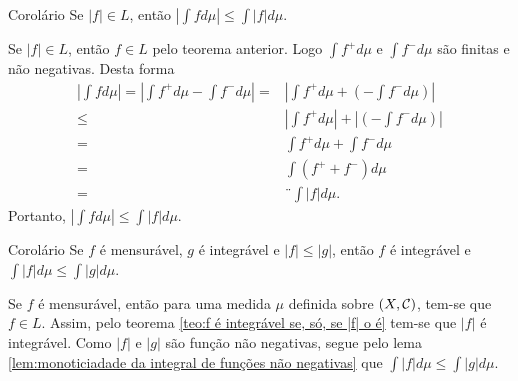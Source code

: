 \begin{env}{Corolário}
	Se $|f| \in L$, então $\displaystyle \left|\int f d\mu\right| \leq \int |f| d\mu$.
\end{env}
\begin{prova}
	Se $|f| \in L$, então $f \in L$ pelo teorema anterior.
	Logo $\int f^+ d\mu$ e $\int f^- d\mu$ são finitas e não negativas.
	Desta forma
	\begin{align*}
		\left|\int f d\mu \right|
		=
		\left|\int f^+ d\mu - \int f^- d\mu\right|
		= &
		\left|\int f^+ d\mu + \left(- \int f^- d\mu\right)\right|\\
		\leq&
		\left|\int f^+ d\mu\right| + \left|\left(- \int f^- d\mu\right)\right|\\
		=&
		\int f^+ d\mu + \int f^- d\mu\\
		= &
		\int (f^+ + f^-) d\mu\\
		=&¨
		\int |f| d\mu.
	\end{align*}
	Portanto, $\displaystyle \left|\int f d\mu \right| \leq  \int |f| d\mu.$
\end{prova}

\begin{env}{Corolário}
	\label{cor: f é mensurável, g é integrável então f é integrável}
	Se $f$ é mensurável, $g$ é integrável e $|f| \leq |g|$, então  $f$ é integrável e $\displaystyle \int |f| d\mu \leq \int |g| d\mu$.
\end{env}
\begin{prova}
	Se $f$ é mensurável, então para uma medida $\mu$ definida sobre $(X,\operatorname{\mathcal{C}})$, tem-se que $f \in L$. Assim, pelo teorema \ref{teo:f é integrável se, só, se |f| o é} tem-se que $|f|$ é integrável.
	Como $|f|$ e $|g|$ são função não negativas, segue pelo lema
	\ref{lem:monoticiadade da integral de funções não negativas} que 
	$\displaystyle \int |f| d\mu \leq \int |g| d\mu$.
\end{prova}


